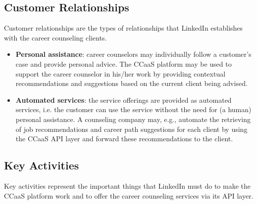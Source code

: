 \subsection{Customer Relationships}

Customer relationships are the types of relationships that LinkedIn establishes with the career
counseling clients.

\begin{itemize}
    \item \textbf{Personal assistance}: career counselors may individually follow a customer's case and 
            provide personal advice. The CCaaS platform may be used to support the career counselor
            in his/her work by providing contextual recommendations and suggestions based on the 
            current client being advised.
    \item \textbf{Automated services}: the service offerings are provided as automated services, i.e. 
            the customer can use the service without the need for (a human) personal assistance.
            A counseling company may, e.g., automate the retrieving of job recommendations and 
            career path suggestions for each client by using the CCaaS API layer and forward
            these recommendations to the client. 
\end{itemize}

\subsection{Key Activities}

Key activities represent the important things that LinkedIn must do to make the CCaaS platform work
and to offer the career counseling services via its API layer.

